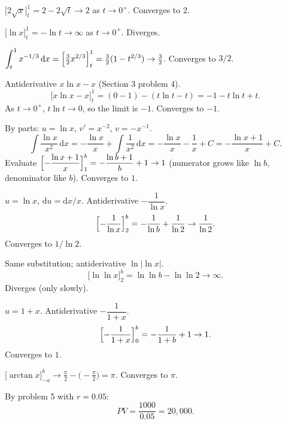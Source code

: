 \begin{solutions}
  \item $\displaystyle\bigl[2\sqrt{x}\bigr]_{t}^{1}=2-2\sqrt{t}\to 2$
        as $t\to 0^{+}$. Converges to $2$.

  \item $\displaystyle\bigl[\ln x\bigr]_{t}^{1}=-\ln t\to\infty$ as
        $t\to 0^{+}$. Diverges.

  \item $\displaystyle\int_{t}^{1} x^{-1/3}\,\mathrm{d}x
        =\Bigl[\tfrac{3}{2}x^{2/3}\Bigr]_{t}^{1}
        =\tfrac{3}{2}(1-t^{2/3})\to\tfrac{3}{2}$. Converges to $3/2$.

  \item Antiderivative $x\ln x-x$ (Section 3 problem 4).
        \[
          \bigl[x\ln x-x\bigr]_{t}^{1}=(0-1)-(t\ln t-t)=-1-t\ln t+t .
        \]
        As $t\to 0^{+}$, $t\ln t\to 0$, so the limit is $-1$. Converges
        to $-1$.

  \item By parts: $u=\ln x$, $v'=x^{-2}$, $v=-x^{-1}$.
        \[
          \int \frac{\ln x}{x^{2}}\,\mathrm{d}x
            =-\frac{\ln x}{x}+\int \frac{1}{x^{2}}\,\mathrm{d}x
            =-\frac{\ln x}{x}-\frac{1}{x}+C=-\frac{\ln x+1}{x}+C .
        \]
        Evaluate $\displaystyle\Bigl[-\frac{\ln x+1}{x}\Bigr]_{1}^{b}
        =-\frac{\ln b+1}{b}+1\to 1$ (numerator grows like $\ln b$,
        denominator like $b$). Converges to $1$.

  \item $u=\ln x$, $\mathrm{d}u=\mathrm{d}x/x$. Antiderivative
        $-\dfrac{1}{\ln x}$.
        \[
          \Bigl[-\frac{1}{\ln x}\Bigr]_{2}^{b}
            =-\frac{1}{\ln b}+\frac{1}{\ln 2}\to\frac{1}{\ln 2} .
        \]
        Converges to $1/\ln 2$.

  \item Same substitution; antiderivative $\ln|\ln x|$.
        \[
          \bigl[\ln\ln x\bigr]_{2}^{b}=\ln\ln b-\ln\ln 2\to\infty .
        \]
        Diverges (only slowly).

  \item $u=1+x$. Antiderivative $-\dfrac{1}{1+x}$.
        \[
          \Bigl[-\frac{1}{1+x}\Bigr]_{0}^{b}
            =-\frac{1}{1+b}+1\to 1 .
        \]
        Converges to $1$.

  \item $\displaystyle\bigl[\arctan x\bigr]_{-a}^{b}
        \to\frac{\pi}{2}-\bigl(-\frac{\pi}{2}\bigr)=\pi$. Converges to
        $\pi$.

  \item By problem 5 with $r=0.05$:
        \[
          PV=\frac{1000}{0.05}=20{,}000 .
        \]


\end{solutions}
